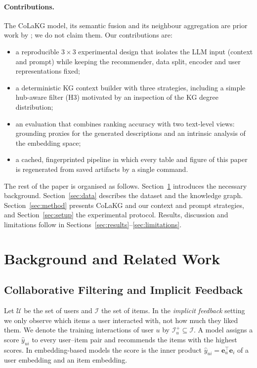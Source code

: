 \documentclass[a4paper,11pt]{article}
\begin{document}
\paragraph{Contributions.} The CoLaKG model, its semantic fusion and its neighbour aggregation are prior work by \citet{cui2025colakg}; we do not claim them. Our contributions are:
\begin{itemize}
    \item a reproducible $3\times3$ experimental design that isolates the LLM input (context and prompt) while keeping the recommender, data split, encoder and user representations fixed;
    \item a deterministic KG context builder with three strategies, including a simple hub-aware filter (H3) motivated by an inspection of the KG degree distribution;
    \item an evaluation that combines ranking accuracy with two text-level views: grounding proxies for the generated descriptions and an intrinsic analysis of the embedding space;
    \item a cached, fingerprinted pipeline in which every table and figure of this paper is regenerated from saved artifacts by a single command.
\end{itemize}

The rest of the paper is organised as follows. Section~\ref{sec:background} introduces the necessary background. Section~\ref{sec:data} describes the dataset and the knowledge graph. Section~\ref{sec:method} presents CoLaKG and our context and prompt strategies, and Section~\ref{sec:setup} the experimental protocol. Results, discussion and limitations follow in Sections~\ref{sec:results}--\ref{sec:limitations}.

\section{Background and Related Work}
\label{sec:background}
\subsection{Collaborative Filtering and Implicit Feedback}
Let $\mathcal{U}$ be the set of users and $\mathcal{I}$ the set of items. In the \emph{implicit feedback} setting we only observe which items a user interacted with, not how much they liked them. We denote the training interactions of user $u$ by $\mathcal{I}_u^{+}\subseteq\mathcal{I}$. A model assigns a score $\hat{y}_{ui}$ to every user--item pair and recommends the items with the highest scores. In embedding-based models the score is the inner product $\hat{y}_{ui}=\mathbf{e}_u^\top\mathbf{e}_i$ of a user embedding and an item embedding.
\end{document}
